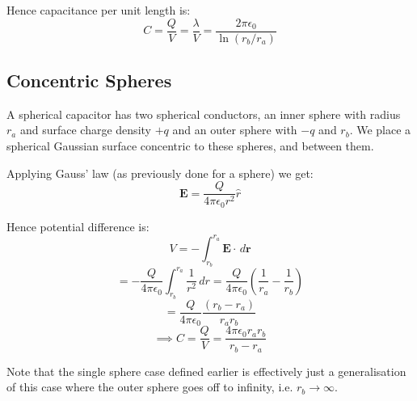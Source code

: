 Hence capacitance per unit length is:
\[
    C = \frac{Q}{V} = \frac{\lambda}{V} = \frac{2 \pi \epsilon_0}{\ln(r_b / r_a)}
\]


\subsection{Concentric Spheres}
A spherical capacitor has two spherical conductors, an inner sphere with radius $r_a$ and surface charge density $+q$ and an outer sphere with $-q$ and $r_b$. We place a spherical Gaussian surface concentric to these spheres, and between them.

Applying Gauss' law (as previously done for a sphere) we get:
\[
    \pmb{E} = \frac{Q}{4 \pi \epsilon_0 r^2} \hat{r}
\]

Hence potential difference is:
\[
    V = - \int_{r_b}^{r_a} \pmb{E} \cdot \, d \pmb{r}
\]
\[
    = - \frac{Q}{4 \pi \epsilon_0} \int_{r_b}^{r_a} \frac{1}{r^2} \, dr = \frac{Q}{4 \pi \epsilon_0} \left(\frac{1}{r_a} - \frac{1}{r_b}\right)
\]
\[
    = \frac{Q}{4 \pi \epsilon_0} \frac{(r_b - r_a)}{r_a r_b}
\]
\[
    \implies \boxed{C = \frac{Q}{V} = \frac{4 \pi \epsilon_0 r_a r_b}{r_b - r_a}}
\]

Note that the single sphere case defined earlier is effectively just a generalisation of this case where the outer sphere goes off to infinity, i.e. $r_b \to \infty$.



